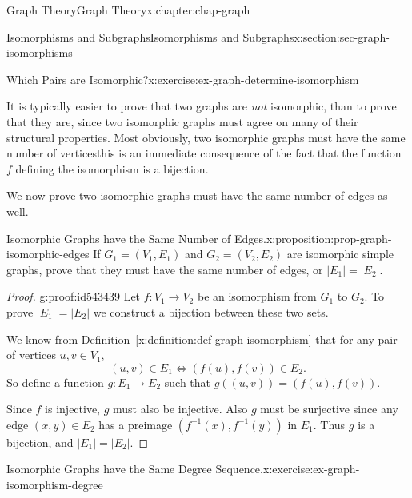\documentclass[oneside,10pt,]{book}
\newcommand{\xreffont}{\relax}
\numberwithin{equation}{section}
\begin{document}
\begin{chapterptx}{Graph Theory}{}{Graph Theory}{}{}{x:chapter:chap-graph}
\begin{sectionptx}{Isomorphisms and Subgraphs}{}{Isomorphisms and Subgraphs}{}{}{x:section:sec-graph-isomorphisms}
\begin{inlineexercise}{Which Pairs are Isomorphic?}{x:exercise:ex-graph-determine-isomorphism}
\begin{sidebyside}{2}{0.0425}{0.0425}{0.085}
\begin{sbspanel}{0.23}
{
}%
\end{sbspanel}%
\end{sidebyside}%
\end{inlineexercise}%
It is typically easier to prove that two graphs are \emph{not} isomorphic, than to prove that they are, since two isomorphic graphs must agree on many of their structural properties. Most obviously, two isomorphic graphs must have the same number of vertices\textemdash{}this is an immediate consequence of the fact that the function \(f\) defining the isomorphism is a bijection.%
\par
We now prove two isomorphic graphs must have the same number of edges as well.%
\begin{proposition}{Isomorphic Graphs have the Same Number of Edges.}{}{x:proposition:prop-graph-isomorphic-edges}%
If \(G_1 = (V_1,E_1)\) and \(G_2 = (V_2,E_2)\) are isomorphic simple graphs, prove that they must have the same number of edges, or \(|E_1| = |E_2|\).%
\end{proposition}
\begin{proof}{}{g:proof:id543439}
Let \(f: V_1 \rightarrow V_2\) be an isomorphism from \(G_1\) to \(G_2\). To prove \(|E_1| = |E_2|\) we construct a bijection between these two sets.%
\par
We know from \hyperref[x:definition:def-graph-isomorphism]{Definition~{\xreffont\ref{x:definition:def-graph-isomorphism}}} that for any pair of vertices \(u,v \in V_1\),%
\begin{equation*}
(u,v) \in E_1 \Leftrightarrow (f(u),f(v)) \in E_2\text{.}
\end{equation*}
So define a function \(g: E_1 \rightarrow E_2\) such that \(g\left( (u,v) \right) = \left( f(u),f(v)\right)\).%
\par
Since \(f\) is injective, \(g\) must also be injective. Also \(g\) must be surjective since any edge \((x,y) \in E_2\) has a preimage \((f^{-1}(x),f^{-1}(y))\) in \(E_1\). Thus \(g\) is a bijection, and \(|E_1| = |E_2|\).%
\end{proof}
\begin{inlineexercise}{Isomorphic Graphs have the Same Degree Sequence.}{x:exercise:ex-graph-isomorphism-degree}%

\end{inlineexercise}
\end{sectionptx}
\end{chapterptx}
\end{document}
